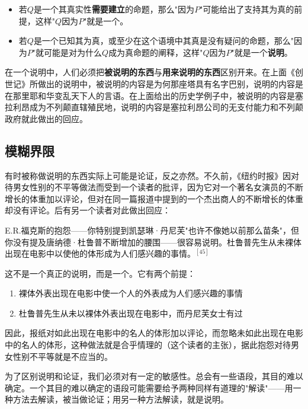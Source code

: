 \begin{itemize}
  \item 若$Q$是一个其真实性\textbf{需要建立}的命题，那么"因为$P$"可能给出了支持其为真的前提，这样"$Q$因为$P$"就是一个。
  \item 若$Q$是一个已知其为真，或至少在这个语境中其真是没有疑问的命题，那么"因为$P$"就可能是对为什么$Q$成为真命题的阐释，这样"$Q$因为$P$"就是一个\textbf{说明}。
\end{itemize}

在一个说明中，人们必须把\textbf{被说明的东西}与\textbf{用来说明的东西}区别开来。在上面《创世记》所做出的说明中，被说明的内容是为何那座塔具有名字巴别，说明的内容是在那里耶和华变乱天下人的言语。在上面给出的历史学例子中，被说明的内容是塞拉利昂成为不列颠直辖殖民地，说明的内容是塞拉利昂公司的无支付能力和不列颠政府就此做出的回应。

\subsection{模糊界限}

有时被称做说明的东西实际上可能是论证，反之亦然。不久前，《纽约时报》因对待男女性别的不平等做法而受到一个读者的批评，因为它对一个著名女演员的不断增长的体重加以评论，但对在同一篇报道中提到的一个杰出商人的不断增长的体重却没有评论。后有另一个读者对此做出回应：

\begin{displayquote}
E.R.福克斯的抱怨——你特别提到凯瑟琳·丹尼芙"也许不像她以前那么苗条"，但你没有提及唐纳德·杜鲁普不断增加的腰围——很容易说明。杜鲁普先生从未裸体出现在电影中以使他的体形成为人们感兴趣的事情。$^{[45]}$
\end{displayquote}

这不是一个真正的说明，而是一个。它有两个前提：
\begin{enumerate}
  \item 裸体外表出现在电影中使一个人的外表成为人们感兴趣的事情
  \item 杜鲁普先生从未以裸体外表出现在电影中，而丹尼芙女士有过
\end{enumerate}

因此，报纸对如此出现在电影中的名人的体形加以评论，而忽略未如此出现在电影中的名人的体形，这种做法就是合乎情理的（这个读者的主张），据此抱怨对待男女性别不平等就是不应当的。

为了区别说明和论证，我们必须对有一定的敏感性。总会有一些语段，其目的难以确定。一个其目的难以确定的语段可能需要给予两种同样有道理的"解读"——用一种方法去解读，被当做论证；用另一种方法解读，就是说明。

